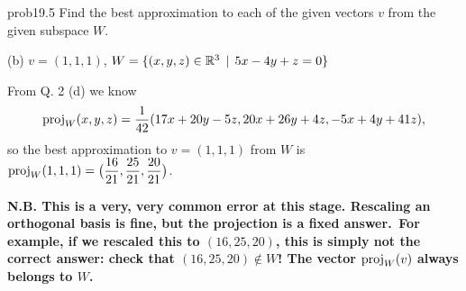 \begin{sol}{prob19.5} Find the best approximation to each of the given vectors $v$ from the given subspace $W$. \medskip

(b) $v=(1,1,1)$,   $W=\{(x,y,z)\in\mathbb{R}^3 \,\mid \, 5x-4y+z=0 \}$

\soln From Q. 2 (d) we know 
$$\operatorname{proj}_W(x,y,z)=\dfrac{1}{42}(17 x+20 y-5 z,20 x+26 y+4 z,-5 x+4 y+41 z),$$ so the best approximation to $v=(1,1,1)$ from  $W$ is $\operatorname{proj}_W(1,1,1)=\big(\dfrac{16}{21},\dfrac{25}{21},\dfrac{20}{21}\big)$.

\medskip
{\bf N.B.  This is a very, very common error at this stage. Rescaling an orthogonal basis is fine, but the projection is a fixed answer.  $\,$For example, if we rescaled this to $(16,25,20)$, this is simply not the correct answer: check that $(16,25,20)\notin W$! The vector $\operatorname{proj}_W(v)$ always belongs to $W$.}
\medskip


\end{sol}

